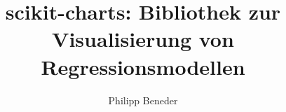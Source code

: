 \documentclass[bachelor,german,smartquotes,apa]{hgbthesis}
\title{scikit-charts: Bibliothek zur Visualisierung von Regressionsmodellen}
\author{Philipp Beneder}
\begin{document}

\frontmatter                                   %

\maketitle
\tableofcontents

		
			

\mainmatter                                    %









\appendix                                                             %


\backmatter                           %

\MakeBibliography %
%




\end{document}
